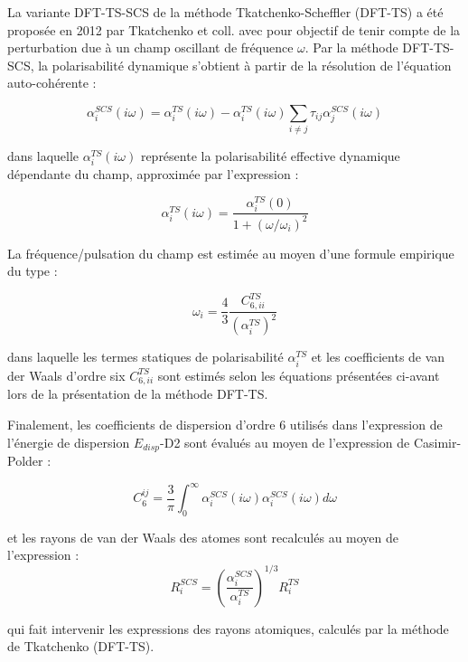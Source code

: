 {	La variante DFT-TS-SCS de la méthode Tkatchenko-Scheffler (DFT-TS) a été proposée en 2012 par Tkatchenko et coll.\cite{tkatchenko2012accurate} avec pour objectif de tenir compte de la perturbation due à un champ oscillant de fréquence $\omega$. Par la méthode DFT-TS-SCS, la polarisabilité dynamique s'obtient à partir de la résolution de l’équation auto-cohérente :
	
	\begin{equation}
	\alpha_{i}^{SCS}(i \omega) = \alpha_{i}^{TS}(i \omega) - \alpha_{i}^{TS}(i \omega) \sum_{i\neq j} \tau_{ij} \alpha_{j}^{SCS}(i \omega)
	\end{equation} 
	
	dans laquelle $\alpha_{i}^{TS}(i \omega)$ représente la polarisabilité effective dynamique dépendante du champ, approximée par l’expression : 
	
	\begin{equation}
	\alpha_{i}^{TS}(i \omega) = \frac{\alpha_{i}^{TS}(0)}{1 + (\omega/\omega_{i})^{2}}
	\end{equation}
	
	La fréquence/pulsation du champ est estimée au moyen d’une formule empirique du type : 
	
	\begin{equation}
	\omega_{i} = \frac{4}{3} \frac{C_{6,ii}^{TS}}{(\alpha_{i}^{TS})^{2}}
	\end{equation}
	
	dans laquelle les termes statiques de polarisabilité $\alpha_{i}^{TS}$ et les coefficients de van der Waals d’ordre six $C_{6,ii}^{TS}$ sont estimés selon les équations présentées ci-avant lors de la présentation de la méthode DFT-TS.
	
	Finalement, les coefficients de dispersion d’ordre 6 utilisés dans l’expression de l’énergie de dispersion $E_{disp}$-D2 sont évalués au moyen de l’expression de Casimir-Polder :
	
	\begin{equation}
	C_{6}^{ij} = \frac{3}{\pi} \int_{0}^{\infty} \alpha_{i}^{SCS} (i\omega) \alpha_{i}^{SCS} (i\omega) d\omega
	\end{equation}
	
	et les rayons de van der Waals des atomes sont recalculés au moyen de l’expression : 	
	\begin{equation}
	R_{i}^{SCS} = \left(\frac{\alpha_{i}^{SCS}}{\alpha_{i}^{TS}}\right)^{1/3} R_{i}^{TS}
	\end{equation}
	
	\noindent qui fait intervenir les expressions des rayons atomiques, calculés par la méthode de Tkatchenko (DFT-TS).

}

